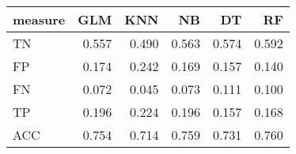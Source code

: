 \begin{tabular}{lrrrrr}
\toprule
measure &   GLM &   KNN &    NB &    DT &    RF \\
\midrule
     TN & 0.557 & 0.490 & 0.563 & 0.574 & 0.592 \\
     FP & 0.174 & 0.242 & 0.169 & 0.157 & 0.140 \\
     FN & 0.072 & 0.045 & 0.073 & 0.111 & 0.100 \\
     TP & 0.196 & 0.224 & 0.196 & 0.157 & 0.168 \\
    ACC & 0.754 & 0.714 & 0.759 & 0.731 & 0.760 \\
\bottomrule
\end{tabular}
